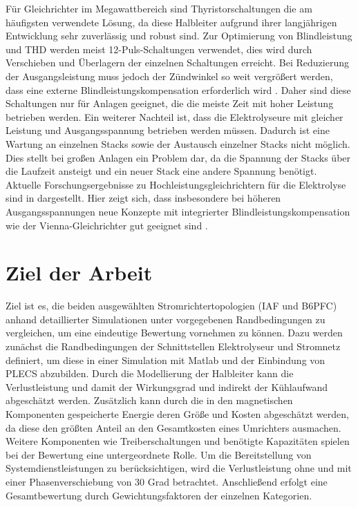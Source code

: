 Für Gleichrichter im Megawattbereich sind Thyristorschaltungen die am häufigsten verwendete Lösung, da diese Halbleiter aufgrund ihrer langjährigen Entwicklung sehr zuverlässig und robust sind. Zur Optimierung von Blindleistung und \gls{THD} werden meist 12-Puls-Schaltungen verwendet, dies wird durch Verschieben und Überlagern der einzelnen Schaltungen erreicht. Bei Reduzierung der Ausgangsleistung muss jedoch der Zündwinkel so weit vergrößert werden, dass eine externe Blindleistungskompensation erforderlich wird \cite{HydrogenElectronicTopologies}. Daher sind diese Schaltungen nur für Anlagen geeignet, die die meiste Zeit mit hoher Leistung betrieben werden. Ein weiterer Nachteil ist, dass die Elektrolyseure mit gleicher Leistung und Ausgangsspannung betrieben werden müssen. Dadurch ist eine Wartung an einzelnen Stacks sowie der Austausch einzelner Stacks nicht möglich. Dies stellt bei großen Anlagen ein Problem dar, da die Spannung der Stacks über die Laufzeit ansteigt und ein neuer Stack eine andere Spannung benötigt.\\
Aktuelle Forschungsergebnisse zu Hochleistungsgleichrichtern für die Elektrolyse sind in \cite{HydrogenRectifier} dargestellt. Hier zeigt sich, dass insbesondere bei höheren Ausgangsspannungen neue Konzepte mit integrierter Blindleistungskompensation wie der Vienna-Gleichrichter gut geeignet sind \cite{HydrogenRectifier}.
\section{Ziel der Arbeit}
Ziel ist es, die beiden ausgewählten Stromrichtertopologien (\gls{IAF} und \gls{B6PFC}) anhand detaillierter Simulationen unter vorgegebenen Randbedingungen zu vergleichen, um eine eindeutige Bewertung vornehmen zu können. Dazu werden zunächst die Randbedingungen der Schnittstellen Elektrolyseur und Stromnetz definiert, um diese in einer Simulation mit Matlab und der Einbindung von PLECS abzubilden. Durch die Modellierung der Halbleiter kann die Verlustleistung und damit der Wirkungsgrad und indirekt der Kühlaufwand abgeschätzt werden. Zusätzlich kann durch die in den magnetischen Komponenten gespeicherte Energie deren Größe und Kosten abgeschätzt werden, da diese den größten Anteil an den Gesamtkosten eines Umrichters ausmachen. Weitere Komponenten wie Treiberschaltungen und benötigte Kapazitäten spielen bei der Bewertung eine untergeordnete Rolle. Um die Bereitstellung von Systemdienstleistungen zu berücksichtigen, wird die Verlustleistung ohne und mit einer Phasenverschiebung von 30 Grad betrachtet. Anschließend erfolgt eine Gesamtbewertung durch Gewichtungsfaktoren der einzelnen Kategorien.